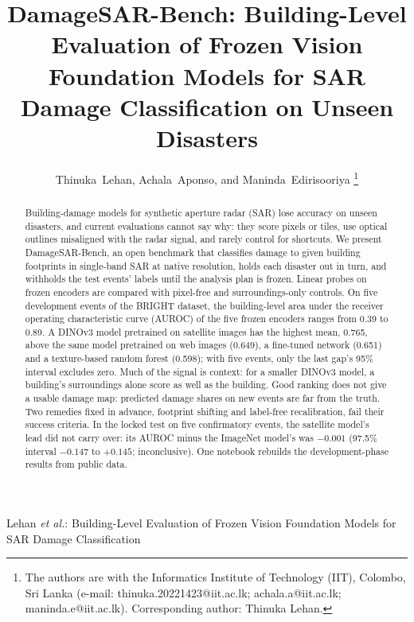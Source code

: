 \documentclass[journal]{IEEEtran}
\begin{document}
\title{DamageSAR-Bench: Building-Level Evaluation of Frozen Vision Foundation Models for SAR Damage Classification on Unseen Disasters}

\author{Thinuka~Lehan, Achala~Aponso, and Maninda~Edirisooriya%
\thanks{The authors are with the Informatics Institute of Technology (IIT), Colombo, Sri Lanka (e-mail: thinuka.20221423@iit.ac.lk; achala.a@iit.ac.lk; maninda.e@iit.ac.lk). Corresponding author: Thinuka Lehan.}}

%
{Lehan \MakeLowercase{\textit{et al.}}: Building-Level Evaluation of Frozen Vision Foundation Models for SAR Damage Classification}

\maketitle

\begin{abstract}
Building-damage models for synthetic aperture radar (SAR) lose accuracy on unseen disasters, and current evaluations cannot say why: they score pixels or tiles, use optical outlines misaligned with the radar signal, and rarely control for shortcuts. We present DamageSAR-Bench, an open benchmark that classifies damage to given building footprints in single-band SAR at native resolution, holds each disaster out in turn, and withholds the test events' labels until the analysis plan is frozen. Linear probes on frozen encoders are compared with pixel-free and surroundings-only controls. On five development events of the BRIGHT dataset, the building-level area under the receiver operating characteristic curve (AUROC) of the five frozen encoders ranges from 0.39 to 0.89. A DINOv3 model pretrained on satellite images has the highest mean, 0.765, above the same model pretrained on web images (0.649), a fine-tuned network (0.651) and a texture-based random forest (0.598); with five events, only the last gap's 95\% interval excludes zero. Much of the signal is context: for a smaller DINOv3 model, a building's surroundings alone score as well as the building. Good ranking does not give a usable damage map: predicted damage shares on new events are far from the truth. Two remedies fixed in advance, footprint shifting and label-free recalibration, fail their success criteria. In the locked test on five confirmatory events, the satellite model's lead did not carry over: its AUROC minus the ImageNet model's was $-0.001$ (97.5\% interval $-0.147$ to $+0.145$; inconclusive). One notebook rebuilds the development-phase results from public data.
\end{abstract}
\end{document}
